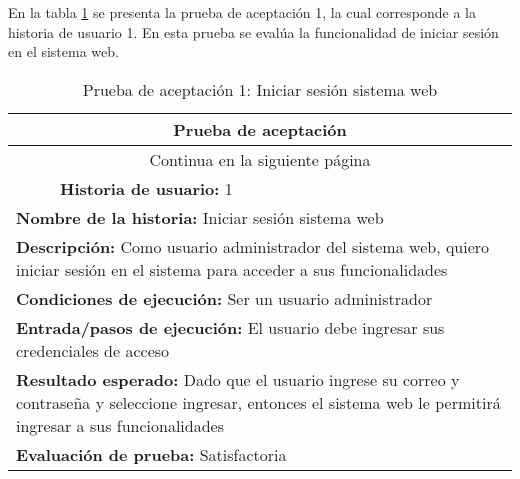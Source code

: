 En la tabla \ref{tab:prueba-1} se presenta la prueba de aceptación 1, la cual corresponde a la historia de usuario 1.
En esta prueba se evalúa la funcionalidad de iniciar sesión en el sistema web.

\begin{longtable}{|p{6.7cm}|p{6.7cm}|}
    \caption{Prueba de aceptación 1: Iniciar sesión sistema web} \label{tab:prueba-1}
    \\
    \hline
    \multicolumn{2}{|c|}{\textbf{Prueba de aceptación}}                                                                                                                                                      \\
    \hline

    \endfirsthead

    \hline
    \endhead

    \hline
    \multicolumn{2}{|c|}{{Continua en la siguiente página}}                                                                                                                                                  \\
    \hline
    \endfoot

    \hline
    \endlastfoot
    \multicolumn{1}{|p{6.7cm}|}{\textbf{Número} 1 } & \multicolumn{1}{|p{6.7cm}|}{\textbf{Historia de usuario:} 1}                                                                                           \\
    \hline
    \multicolumn{2}{|p{13.4cm}|}{\textbf{Nombre de la historia:} Iniciar sesión sistema web }                                                                                                                \\
    \hline
    \multicolumn{2}{|p{13.4cm}|}{\textbf{Descripción:} Como usuario administrador del sistema web, quiero iniciar sesión en el sistema para acceder a sus funcionalidades}                                   \\
    \hline
    \multicolumn{2}{|p{13.4cm}|}{\textbf{Condiciones de ejecución:} Ser un usuario administrador}                                                                                                            \\
    \hline
    \multicolumn{2}{|p{13.4cm}|}{\textbf{Entrada/pasos de ejecución:} El usuario debe ingresar sus credenciales de acceso}                                                                                   \\
    \hline
    \multicolumn{2}{|p{13.4cm}|}{\textbf{Resultado esperado:} Dado que el usuario ingrese su correo y contraseña y seleccione ingresar, entonces el sistema web le permitirá ingresar a sus funcionalidades} \\
    \hline
    \multicolumn{2}{|p{13.4cm}|}{\textbf{Evaluación de prueba:} Satisfactoria}                                                                                                                               \\
    \hline
\end{longtable}

